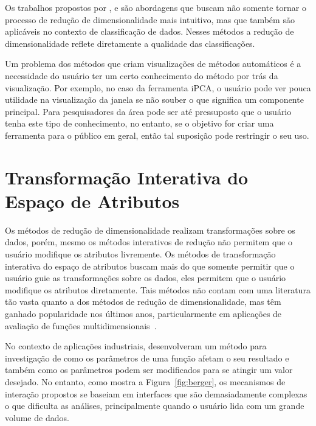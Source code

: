 Os trabalhos propostos por \cite{Choo2010}, \cite{Paiva2012}
e \cite{Zhang2006} são abordagens que buscam não somente
tornar o processo de redução de dimensionalidade mais
intuitivo, mas que também são aplicáveis no contexto de
classificação de dados. Nesses métodos a redução de
dimensionalidade reflete diretamente a qualidade das
classificações. 

Um problema dos métodos que criam visualizações de métodos
automáticos é a necessidade do usuário ter um certo
conhecimento do método por trás da visualização. Por
exemplo, no caso da ferramenta iPCA, o usuário pode ver
pouca utilidade na visualização da janela se não souber o
que significa um componente principal. Para pesquisadores da
área pode ser até pressuposto que o usuário tenha este tipo
de conhecimento, no entanto, se o objetivo for
criar uma ferramenta para o público em geral, então tal
suposição pode restringir o seu uso.

\section{Transformação Interativa do Espaço de Atributos}

Os métodos de redução de dimensionalidade realizam
transformações sobre os dados, porém, mesmo os métodos
interativos de redução não permitem que o usuário modifique
os atributos livremente. Os métodos de transformação
interativa do espaço de atributos buscam mais do que somente
permitir que o usuário guie as transformações sobre os
dados, eles permitem que o usuário modifique os atributos
diretamente. Tais métodos não contam com uma literatura tão
vasta quanto a dos métodos de redução de dimensionalidade,
mas têm ganhado popularidade nos últimos anos,
particularmente em aplicações de avaliação de funções
multidimensionais~\cite{Jayaraman2002,Weber2007,Matkovic2008,
Guo2009}. 

No contexto de aplicações industriais, \cite{Berger2011}
desenvolveram um método para investigação de como os
parâmetros de uma função afetam o seu resultado e também
como os parâmetros podem ser modificados para se atingir um
valor desejado. No entanto, como mostra a
Figura~\ref{fig:berger}, os mecanismos de interação
propostos se baseiam em interfaces que são
demasiadamente complexas o que dificulta as análises,
principalmente quando o usuário lida com um grande volume de
dados.


